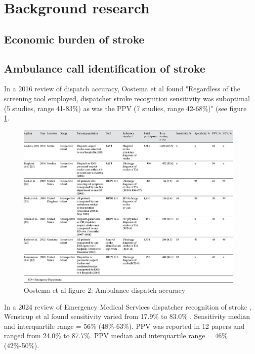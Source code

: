 \section{Background research}


\subsection{Economic burden of stroke}


\subsection{Ambulance call identification of stroke}

In a 2016 review of dispatch accuracy, Oostema et al \cite{oostema_dispatcher_2016} found "Regardless of the screening tool employed, dispatcher stroke recognition sensitivity was suboptimal (5 studies, range 41-83\%) as was the PPV (7 studies, range 42-68\%)" (see figure \ref{fig:oostema}.

\begin{figure}
    \centering
    \includegraphics[width=0.9\linewidth]{images_background/oosetema_dispatch_accuracy}
    \caption{Oostema et al figure 2: Ambulance dispatch accuracy}
    \label{fig:oostema}
\end{figure}

In a 2024 review of Emergency Medical Services dispatcher recognition of stroke \cite{wenstrup_emergency_2024}, Wenstrup et al found sensitivity varied from 17.9\% to 83.0\% . Sensitivity median and interquartile range = 56\% (48\%-63\%). PPV was reported in 12 papers and ranged from 24.0\% to 87.7\%. PPV median and interquartile range = 46\% (42\%-50\%).

